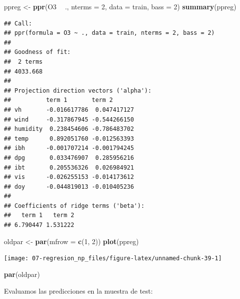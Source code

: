 \documentclass[
  spanish,
]{book}
\newenvironment{Shaded}{\begin{snugshade}}{\end{snugshade}}
\newcommand{\DataTypeTok}[1]{\textcolor[rgb]{0.13,0.29,0.53}{#1}}
\newcommand{\DecValTok}[1]{\textcolor[rgb]{0.00,0.00,0.81}{#1}}
\newcommand{\KeywordTok}[1]{\textcolor[rgb]{0.13,0.29,0.53}{\textbf{#1}}}
\newcommand{\NormalTok}[1]{#1}
\newcommand{\OperatorTok}[1]{\textcolor[rgb]{0.81,0.36,0.00}{\textbf{#1}}}
\newcommand{\StringTok}[1]{\textcolor[rgb]{0.31,0.60,0.02}{#1}}
\theoremstyle{break}
\theoremstyle{definition}
\theoremstyle{definition}
\theoremstyle{definition}
\theoremstyle{remark}
\begin{document}
\begin{Shaded}
\begin{Highlighting}[]
\NormalTok{ppreg <-}\StringTok{ }\KeywordTok{ppr}\NormalTok{(O3 }\OperatorTok{~}\StringTok{ }\NormalTok{., }\DataTypeTok{nterms =} \DecValTok{2}\NormalTok{, }\DataTypeTok{data =}\NormalTok{ train, }\DataTypeTok{bass =} \DecValTok{2}\NormalTok{)}
\KeywordTok{summary}\NormalTok{(ppreg)}
\end{Highlighting}
\end{Shaded}

\begin{verbatim}
## Call:
## ppr(formula = O3 ~ ., data = train, nterms = 2, bass = 2)
## 
## Goodness of fit:
##  2 terms 
## 4033.668 
## 
## Projection direction vectors ('alpha'):
##          term 1       term 2      
## vh       -0.016617786  0.047417127
## wind     -0.317867945 -0.544266150
## humidity  0.238454606 -0.786483702
## temp      0.892051760 -0.012563393
## ibh      -0.001707214 -0.001794245
## dpg       0.033476907  0.285956216
## ibt       0.205536326  0.026984921
## vis      -0.026255153 -0.014173612
## doy      -0.044819013 -0.010405236
## 
## Coefficients of ridge terms ('beta'):
##   term 1   term 2 
## 6.790447 1.531222
\end{verbatim}

\begin{Shaded}
\begin{Highlighting}[]
\NormalTok{oldpar <-}\StringTok{ }\KeywordTok{par}\NormalTok{(}\DataTypeTok{mfrow =} \KeywordTok{c}\NormalTok{(}\DecValTok{1}\NormalTok{, }\DecValTok{2}\NormalTok{))}
\KeywordTok{plot}\NormalTok{(ppreg)}
\end{Highlighting}
\end{Shaded}

\begin{center}\texttt{[image: 07-regresion\_np\_files/figure-latex/unnamed-chunk-39-1]} \end{center}

\begin{Shaded}
\begin{Highlighting}[]
\KeywordTok{par}\NormalTok{(oldpar)}
\end{Highlighting}
\end{Shaded}

Evaluamos las predicciones en la muestra de test:

\begin{Shaded}
\end{Shaded}
\end{document}
